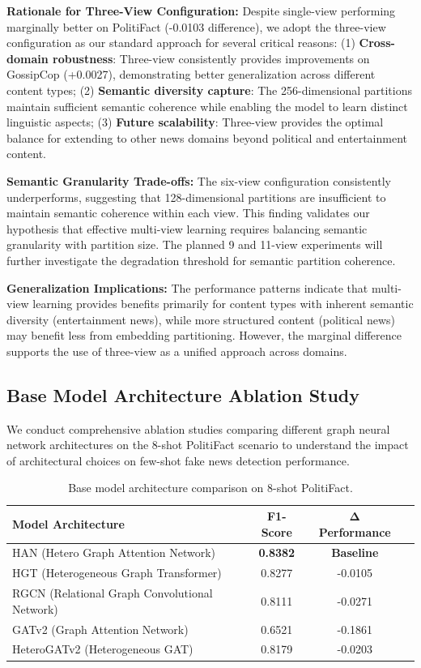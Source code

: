 \textbf{Rationale for Three-View Configuration:} Despite single-view performing marginally better on PolitiFact (-0.0103 difference), we adopt the three-view configuration as our standard approach for several critical reasons: (1) \textbf{Cross-domain robustness}: Three-view consistently provides improvements on GossipCop (+0.0027), demonstrating better generalization across different content types; (2) \textbf{Semantic diversity capture}: The 256-dimensional partitions maintain sufficient semantic coherence while enabling the model to learn distinct linguistic aspects; (3) \textbf{Future scalability}: Three-view provides the optimal balance for extending to other news domains beyond political and entertainment content.

\textbf{Semantic Granularity Trade-offs:} The six-view configuration consistently underperforms, suggesting that 128-dimensional partitions are insufficient to maintain semantic coherence within each view. This finding validates our hypothesis that effective multi-view learning requires balancing semantic granularity with partition size. The planned 9 and 11-view experiments will further investigate the degradation threshold for semantic partition coherence.

\textbf{Generalization Implications:} The performance patterns indicate that multi-view learning provides benefits primarily for content types with inherent semantic diversity (entertainment news), while more structured content (political news) may benefit less from embedding partitioning. However, the marginal difference supports the use of three-view as a unified approach across domains.

\subsection{Base Model Architecture Ablation Study}

We conduct comprehensive ablation studies comparing different graph neural network architectures on the 8-shot PolitiFact scenario to understand the impact of architectural choices on few-shot fake news detection performance.

\begin{table}[htbp]
\centering
\caption{Base model architecture comparison on 8-shot PolitiFact.}
\label{tab:base_model_ablation}
\begin{tabular}{lccc}
\toprule
\textbf{Model Architecture} & \textbf{F1-Score} & \textbf{Δ Performance} \\
\midrule
HAN (Hetero Graph Attention Network) & \textbf{0.8382} & \textbf{Baseline} \\
HGT (Heterogeneous Graph Transformer) & 0.8277 & -0.0105 \\
RGCN (Relational Graph Convolutional Network) & 0.8111 & -0.0271 \\
GATv2 (Graph Attention Network) & 0.6521 & -0.1861 \\ 
HeteroGATv2 (Heterogeneous GAT) & 0.8179 & -0.0203 \\
\bottomrule
\end{tabular}
\end{table}

